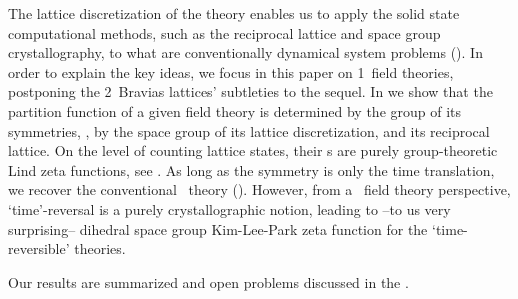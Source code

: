 The lattice discretization of the theory enables us to apply the
solid state computational methods, such as the reciprocal lattice and
space group crystallography, to what are conventionally dynamical
system problems (). In order to explain the
key ideas,
we focus in this paper on 1\dmn\ field theories, postponing the
2\dmn\ Bravias lattices' subtleties to the sequel.
In  we show that the partition function of a
given field theory is determined by the group of its symmetries, \ie,
by the space group of its lattice discretization,
and its reciprocal lattice.
On the level of counting lattice states, their {\tzeta}s are purely
group-theoretic Lind zeta functions, see .
As long as the symmetry is only the time translation, we recover the
conventional \po\ theory
().
However, from a \spt\ field theory perspective, `time'-reversal is a
purely crystallographic notion, leading to --to us very surprising--
dihedral space group Kim-Lee-Park zeta function
 for the  `time-reversible' theories.

Our results are summarized and open problems discussed in the
.
